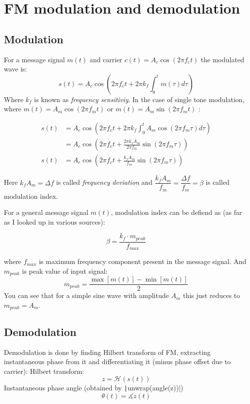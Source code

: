 \chapter{FM modulation and demodulation}
\section{Modulation}
For a message signal $m(t)$ and carrier $c(t) = A_c \cos(2\pi f_c t)$ the modulated wave is:
\begin{equation*}
s (t) = A_c \cos\left(2\pi f_c t + 2\pi k_f \int_{0}^{t} m(\tau) d\tau\right)
\end{equation*}
Where $k_f$ is known as \textit{frequency sensitiviy}.
In the case of single tone modulation, where $m(t) = A_m \cos(2\pi f_m t)$ or $m(t) = A_m \sin(2\pi f_m t)$ :

\begin{align*}
	s (t) &= A_c \cos\left(2\pi f_c t + 2\pi k_f \int_{0}^{t} A_m\cos(2\pi f_m \tau) d\tau\right) \\
	&= A_c \cos\left(2\pi f_c t + \frac{2\pi k_f A_m}{2\pi f_m} \sin(2\pi f_m \tau) \right) \\
	s(t) &= A_c \cos\left(2\pi f_c t + \frac{k_f A_m}{f_m} \sin(2\pi f_m \tau) \right)
\end{align*}

Here $k_f A_m = \Delta f$ is called  \textit{frequency deviation} and $\dfrac{k_f A_m}{f_m} = \dfrac{\Delta f}{f_m} = \beta$ is called modulation index.

For a general message signal $m(t)$, modulation index can be defiend as (as far as I looked up in various sources):

$$\beta = \frac{k_f\cdot m_{peak}}{f_{max}}$$

where $f_{max}$ is maximum frequency component present in the message signal. And $m_{peak}$ is peak value of input signal:
$$m_{peak} = \frac{\max\left[m(t) \right] - \min\left[m(t) \right]}{2}$$
You can see that for a simple sine wave with amplitude $A_m$ this just reduces to $m_{peak} = A_m$.


\section{Demodulation}
Demodulation is done by finding Hilbert transform of FM, extracting instantaneous phase from it and differentiating it (minus phase offset due to carrier):
Hilbert transform: 
$$z = \mathcal{H}(s(t))$$
Instantaneous phase angle (obtained by \texttt|unwrap(angle(z))|)
$$\theta(t) = \measuredangle z(t)$$

